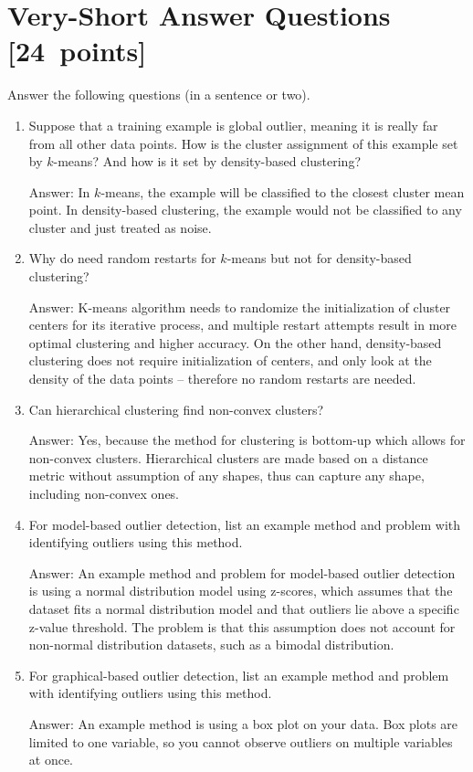 \documentclass{article}
\newcommand{\blu}[1]{{\textcolor{blu}{#1}}}
\newcommand{\gre}[1]{\textcolor{gre}{#1}}
\newcommand\ans[1]{\par\gre{Answer: #1}}
\let\ask\blu
\newcommand\pts[1]{\textcolor{pointscolour}{[#1~points]}}
\begin{document}
\section{Very-Short Answer Questions \pts{24}}

\ask{Answer the following questions (in a sentence or two).}

\begin{enumerate}
\item Suppose that a training example is global outlier, meaning it is really far from all other data points. How is the cluster assignment of this example set by $k$-means? And how is it set by density-based clustering?
\ans{In $k$-means, the example will be classified to the closest cluster mean point. In density-based clustering, the example would not be classified to any cluster and just treated as noise. }

\item Why do need random restarts for $k$-means but not for density-based clustering?
\ans{K-means algorithm needs to randomize the initialization of cluster centers for its iterative process, and multiple restart attempts result in more optimal clustering and higher accuracy. On the other hand, density-based clustering does not require initialization of centers, and only look at the density of the data points – therefore no random restarts are needed.}

\item Can hierarchical clustering find non-convex clusters?
\ans{Yes, because the method for clustering is bottom-up which allows for non-convex clusters. Hierarchical clusters are made based on a distance metric without assumption of any shapes, thus can capture any shape, including non-convex ones.}

\item For model-based outlier detection, list an example method and problem with identifying outliers using this method.
\ans{An example method and problem for model-based outlier detection is using a normal distribution model using z-scores, which assumes that the dataset fits a normal distribution model and that outliers lie above a specific z-value threshold. The problem is that this assumption does not account for non-normal distribution datasets, such as a bimodal distribution. }

\item For graphical-based outlier detection, list an example method and problem with identifying outliers using this method.
\ans{An example method is using a box plot on your data. Box plots are limited to one variable, so you cannot observe outliers on multiple variables at once.}


\end{enumerate}
\end{document}
